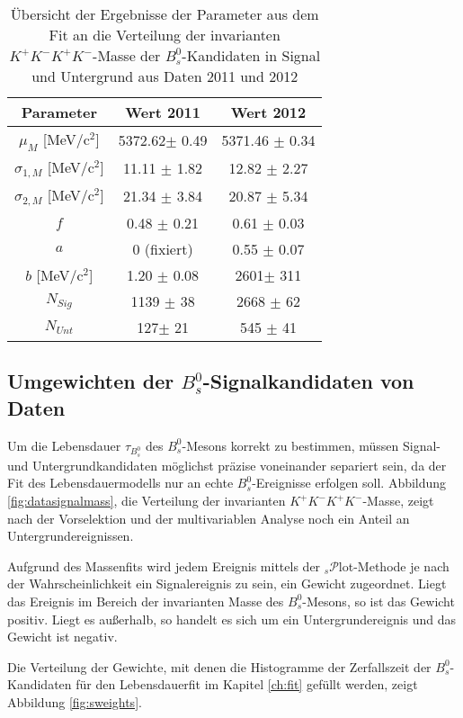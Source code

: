 \documentclass{article}
\begin{document}
\begin{table}[h!]
\noindent \begin{centering}
\begin{tabular}{c|c|c}
Parameter & Wert 2011 & Wert 2012 \tabularnewline
\hline 
$\mu_M$ [MeV/c$^2$]& 5372.62$\pm$ 0.49& 5371.46 $\pm$ 0.34 \tabularnewline
$\sigma_{1,M}$ [MeV/c$^2$] & 11.11 $\pm$ 1.82& 12.82 $\pm$ 2.27 \tabularnewline
$\sigma_{2,M}$ [MeV/c$^2$] & 21.34 $\pm$ 3.84& 20.87 $\pm$ 5.34 \tabularnewline
$f$ & 0.48 $\pm$ 0.21& 0.61 $\pm$ 0.03 \tabularnewline
$a$ & 0 (fixiert) & 0.55 $\pm$ 0.07\tabularnewline
$b$ [MeV/c$^2$]& 1.20 $\pm$ 0.08 & 2601$\pm$ 311 \tabularnewline
$N_{Sig}$ & 1139 $\pm$ 38& 2668 $\pm$ 62 \tabularnewline
$N_{Unt}$ & 127$\pm$ 21& 545 $\pm$ 41 \tabularnewline
\end{tabular}
\par\end{centering}
\caption{Übersicht der Ergebnisse der Parameter aus dem Fit an die Verteilung der invarianten $K^+K^-K^+K^-$-Masse der $B_s^0$-Kandidaten in Signal und Untergrund aus Daten 2011 und 2012}
\label{table:datasignalmass}
\end{table}


\subsection{Umgewichten der $B_s^0$-Signalkandidaten von Daten} \label{sweighting}
Um die Lebensdauer $\tau_{B_s^0}$ des $B_s^0$-Mesons  korrekt zu bestimmen, müssen Signal- und Untergrundkandidaten möglichst präzise voneinander separiert sein, da der Fit des Lebensdauermodells nur an echte $B_s^0$-Ereignisse erfolgen soll. Abbildung \ref{fig:datasignalmass}, die Verteilung der invarianten $K^+K^-K^+K^-$-Masse, zeigt nach der Vorselektion und der multivariablen Analyse noch ein Anteil an Untergrundereignissen.

Aufgrund des Massenfits wird jedem Ereignis mittels der $_s\mathcal{P}$lot-Methode \cite{sweight} je nach der Wahrscheinlichkeit ein Signalereignis zu sein, ein Gewicht zugeordnet. Liegt das Ereignis im Bereich der invarianten Masse des $B_s^0$-Mesons, so ist das Gewicht positiv. Liegt es außerhalb, so handelt es sich um ein Untergrundereignis und das Gewicht ist negativ.

Die Verteilung der Gewichte, mit denen die Histogramme der Zerfallszeit der $B_s^0$-Kandidaten für den Lebensdauerfit im Kapitel \ref{ch:fit} gefüllt werden, zeigt Abbildung \ref{fig:sweights}.
\end{document}
